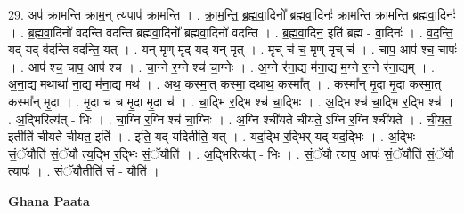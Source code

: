 \documentclass[17pt]{extarticle}
\begin{document}
29. अप॑ क्रामन्ति क्राम॒न् त्यपाप॑ क्रामन्ति । . क्रा॒म॒न्ति॒ ब्र॒ह्म॒वा॒दिनो᳚ ब्रह्मवा॒दिनः॑ क्रामन्ति क्रामन्ति ब्रह्मवा॒दिनः॑ । . ब्र॒ह्म॒वा॒दिनो॑ वदन्ति वदन्ति ब्रह्मवा॒दिनो᳚ ब्रह्मवा॒दिनो॑ वदन्ति । . ब्र॒ह्म॒वा॒दिन॒ इति॑ ब्रह्म - वा॒दिनः॑ । . व॒द॒न्ति॒ यद् यद् व॑दन्ति वदन्ति॒ यत् । . यन् मृण् मृद् यद् यन् मृत् । . मृच् च॑ च॒ मृण् मृच् च॑ । . चाप॒ आप॑ श्च॒ चापः॑ । . आप॑ श्च॒ चाप॒ आप॑ श्च । . चा॒ग्ने र॒ग्ने श्च॑ चा॒ग्नेः । . अ॒ग्ने र॑ना॒द्य म॑ना॒द्य म॒ग्ने र॒ग्ने र॑ना॒द्यम् । . अ॒ना॒द्य मथाथा॑ ना॒द्य म॑ना॒द्य मथ॑ । . अथ॒ कस्मा॒त् कस्मा॒ दथाथ॒ कस्मा᳚त् । . कस्मा᳚न् मृ॒दा मृ॒दा कस्मा॒त् कस्मा᳚न् मृ॒दा । . मृ॒दा च॑ च मृ॒दा मृ॒दा च॑ । . चा॒द्भि र॒द्भि श्च॑ चा॒द्भिः । . अ॒द्भि श्च॑ चा॒द्भि र॒द्भि श्च॑ । . अ॒द्भिरित्य॑त् - भिः । . चा॒ग्नि र॒ग्नि श्च॑ चा॒ग्निः । . अ॒ग्नि श्ची॑यते चीयते॒ ऽग्नि र॒ग्नि श्ची॑यते । . ची॒य॒त॒ इतीति॑ चीयते चीयत॒ इति॑ । . इति॒ यद् यदितीति॒ यत् । . यद॒द्भि र॒द्भिर् यद् यद॒द्भिः । . अ॒द्भिः सं॒ॅयौति॑ सं॒ॅयौ त्य॒द्भि र॒द्भिः सं॒ॅयौति॑ । . अ॒द्भिरित्य॑त् - भिः । . सं॒ॅयौ त्याप॒ आपः॑ सं॒ॅयौति॑ सं॒ॅयौ त्यापः॑ । . सं॒ॅयौतीति॑ सं - यौति॑ । \newline

\textbf{Ghana Paata } \newline
\end{document}
